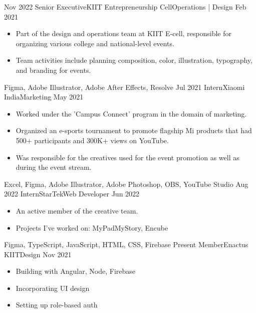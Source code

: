 \begin{experiences}
  \experience
    {Nov 2022} {Senior Executive}{KIIT Entrepreneurship Cell}{Operations | Design}
    {Feb 2021}    {
                      \begin{itemize}
                        \item Part of the design and operations team at KIIT E-cell, responsible for organizing various college and national-level events.                           
                        \item Team activities include planning composition, color, illustration, typography, and branding for events.                                                                    
                      \end{itemize}
                    }
                    {Figma, Adobe Illustrator, Adobe After Effects, Resolve}
  \emptySeparator
  \experience
    {Jul 2021}   {Intern}{Xiaomi India}{Marketing}
    {May 2021} {
                      \begin{itemize}
                        \item Worked under the 'Campus Connect' program in the domain of marketing.
                        \item Organized an e-sports tournament to promote flagship Mi products that had 500+ participants and 300K+ views on YouTube.                    
                        \item Was responsible for the creatives used for the event promotion as well as during the event stream.                                                                    
                      \end{itemize}
                    }
                    {Excel, Figma, Adobe Illustrator, Adobe Photoshop, OBS, YouTube Studio}
  \emptySeparator
  \experience
    {Aug 2022}     {Intern}{StarTek}{Web Developer}
    {Jun 2022}    {
                      \begin{itemize}
                        \item An active member of the creative team.
                        \item Projects I've worked on: MyPadMyStory, Encube
                      \end{itemize}
                    }
                    {Figma, TypeScript, JavaScript, HTML, CSS, Firebase}
                      \emptySeparator
  \experience
    {Present}     {Member}{Enactus KIIT}{Design}
    {Nov 2021}    {
                      \begin{itemize}
                        \item Building with Angular, Node, Firebase
                        \item Incorporating UI design                
                        \item Setting up role-based auth
                      \end{itemize}
                    }
                    {}
\end{experiences}
